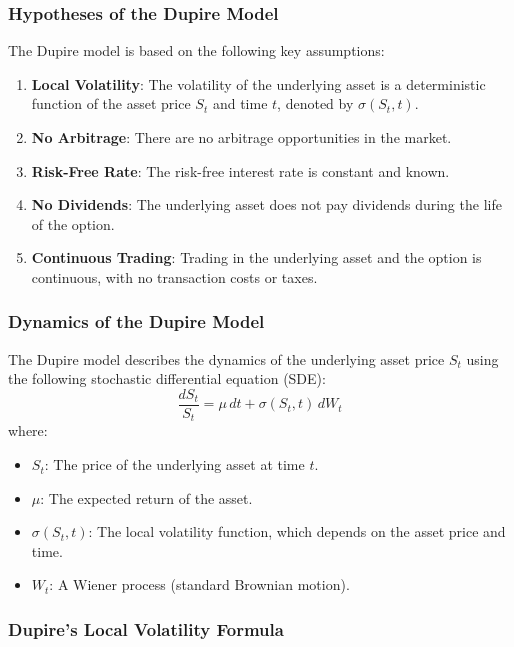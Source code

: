 \documentclass[11pt, oneside, a4paper, titlepage]{report}
\begin{document}
\subsubsection{Hypotheses of the Dupire Model}

The Dupire model is based on the following key assumptions:
\begin{enumerate}
    \item \textbf{Local Volatility}: The volatility of the underlying asset is a deterministic function of the asset price \( S_t \) and time \( t \), denoted by \( \sigma(S_t, t) \).
    \item \textbf{No Arbitrage}: There are no arbitrage opportunities in the market.
    \item \textbf{Risk-Free Rate}: The risk-free interest rate is constant and known.
    \item \textbf{No Dividends}: The underlying asset does not pay dividends during the life of the option.
    \item \textbf{Continuous Trading}: Trading in the underlying asset and the option is continuous, with no transaction costs or taxes.
\end{enumerate}

\subsubsection{Dynamics of the Dupire Model}

The Dupire model describes the dynamics of the underlying asset price \( S_t \) using the following stochastic differential equation (SDE):
\[
\frac{dS_t}{S_t} = \mu \, dt + \sigma(S_t, t) \, dW_t
\]
where:
\begin{itemize}
    \item \( S_t \): The price of the underlying asset at time \( t \).
    \item \( \mu \): The expected return of the asset.
    \item \( \sigma(S_t, t) \): The local volatility function, which depends on the asset price and time.
    \item \( W_t \): A Wiener process (standard Brownian motion).
\end{itemize}

\subsubsection{Dupire's Local Volatility Formula}
\end{document}
